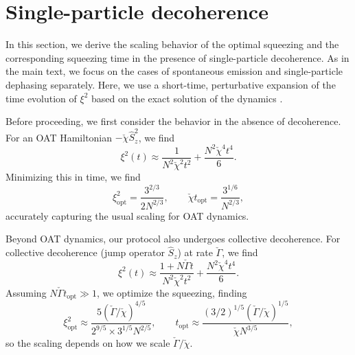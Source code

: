 \documentclass[11pt]{article}
\begin{document}
\section{Single-particle decoherence}
\label{sec:decoherence}

In this section, we derive the scaling behavior of the optimal squeezing and the corresponding squeezing time in the presence of single-particle decoherence. As in the main text, we focus on the cases of spontaneous emission and single-particle dephasing separately. Here, we use a short-time, perturbative expansion of the time evolution of $\xi^2$ based on the exact solution of the dynamics \cite{Chu2021}.

Before proceeding, we first consider the behavior in the absence of decoherence. For an OAT Hamiltonian $-\check{\chi} \hat S_z^2$, we find
\begin{equation}
    \xi^2(t) \approx \frac{1}{N^2 \check{\chi}^2 t^2} + \frac{N^2 \check{\chi}^4 t^4}{6}.
\end{equation}
Minimizing this in time, we find
\begin{equation}
    \xi^2_{\text{opt}} = \frac{3^{2/3}}{2 N^{2/3}}, \qquad
    \check{\chi} t_{\text{opt}} = \frac{3^{1/6}}{N^{2/3}},
\end{equation}
accurately capturing the usual scaling for OAT dynamics. 

Beyond OAT dynamics, our protocol also undergoes collective decoherence. For collective decoherence (jump operator $\hat{S}_z$) at rate $\check{\Gamma}$, we find \cite{Schleier-Smith2010,Lewis-Swan2018,Chu2021,Baamara2022}
\begin{equation}
    \xi^2(t) \approx \frac{1 + N \check{\Gamma} t}{N^2 \check{\chi}^2 t^2} + \frac{N^2 \check{\chi}^4 t^4}{6}.
\end{equation}
Assuming $N \check \Gamma t_{\text{opt}} \gg 1$, we optimize the squeezing, finding
\begin{equation}
    \xi^2_{\text{opt}} \approx \frac{5 (\check{\Gamma}/\check{\chi})^{4/5}}{2^{9/5}\times 3^{1/5}N^{2/5}}, \qquad t_{\text{opt}} \approx \frac{(3/2)^{1/5}(\check \Gamma/ \check \chi)^{1/5}}{\check \chi N^{3/5}},
\end{equation}
so the scaling depends on how we scale $\check \Gamma/\check \chi$. 
\end{document}
